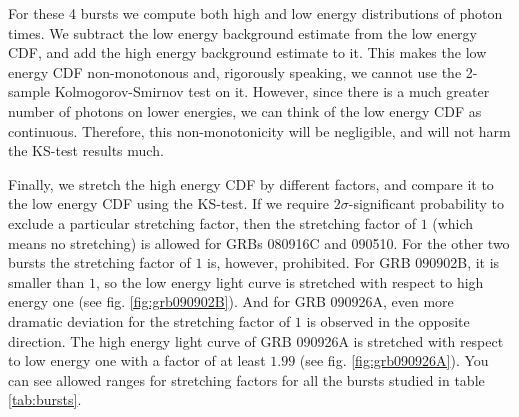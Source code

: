\documentclass[11pt,a4paper]{article}
\begin{document}
For these 4 bursts we compute both high and low energy distributions of photon times.
We subtract the low energy background estimate from the low energy CDF, and add the high energy background estimate to it.
This makes the low energy CDF non-monotonous and, rigorously speaking, we cannot use the 2-sample Kolmogorov-Smirnov test on it.
However, since there is a much greater number of photons on lower energies, we can think of the low energy CDF as continuous.
Therefore, this non-monotonicity will be negligible, and will not harm the KS-test results much.

Finally, we stretch the high energy CDF by different factors, and compare it to the low energy CDF using the KS-test.
If we require $2\sigma$-significant probability to exclude a particular stretching factor, then the stretching factor of $1$ (which means no stretching) is allowed for GRBs 080916C and 090510.
For the other two bursts the stretching factor of $1$ is, however, prohibited.
For GRB 090902B, it is smaller than $1$, so the low energy light curve is stretched with respect to high energy one (see fig. \ref{fig:grb090902B}).
And for GRB 090926A, even more dramatic deviation for the stretching factor of $1$ is observed in the opposite direction.
The high energy light curve of GRB 090926A is stretched with respect to low energy one with a factor of at least $1.99$ (see fig. \ref{fig:grb090926A}).
You can see allowed ranges for stretching factors for all the bursts studied in table \ref{tab:bursts}.
\end{document}
